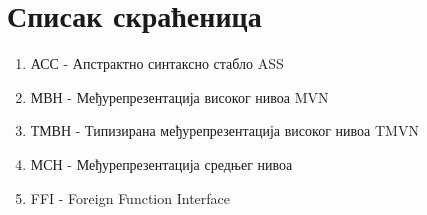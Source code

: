 \section{Списак скраћеница}

\begin{enumerate}
    \item АСС - Апстрактно синтаксно стабло ASS 
    \item МВН - Међурепрезентација високог нивоа MVN 
    \item ТМВН - Типизирана међурепрезентација високог нивоа TMVN 
    \item МСН - Међурепрезентација средњег нивоа 
    \item FFI - Foreign Function Interface
\end{enumerate}